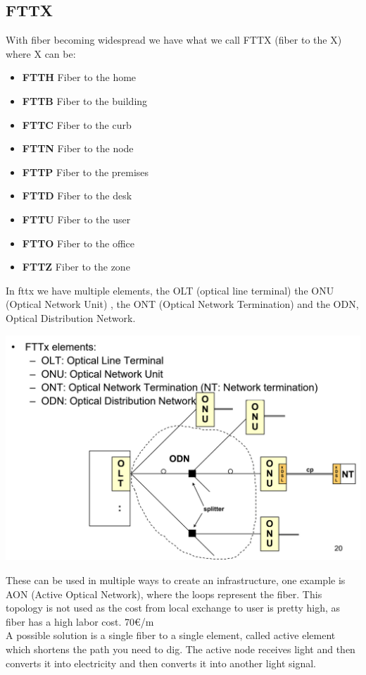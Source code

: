 \documentclass[11pt, a4paper]{article}
\begin{document}
\subsection{FTTX}
With fiber becoming widespread we have what we call FTTX (fiber to the X) where X can be:
\begin{itemize}
    \item \textbf{FTTH} Fiber to the home
    \item \textbf{FTTB} Fiber to the building
    \item \textbf{FTTC} Fiber to the curb
    \item \textbf{FTTN} Fiber to the node
    \item \textbf{FTTP} Fiber to the premises
    \item \textbf{FTTD} Fiber to the desk
    \item \textbf{FTTU} Fiber to the user
    \item \textbf{FTTO} Fiber to the office
    \item \textbf{FTTZ} Fiber to the zone
\end{itemize}
In fttx we have multiple elements, the OLT (optical line terminal) the ONU (Optical Network Unit) , the ONT (Optical Network Termination) and the ODN, Optical Distribution Network.
\begin{center}
    \includegraphics[scale=0.5]{img/AccessNetworks/FTTX/reference.png}
\end{center}
These can be used in multiple ways to create an infrastructure, one example is AON (Active Optical Network), where the loops represent the fiber. This topology is not used as the cost from local exchange to user is pretty high, as fiber has a high labor cost. 70€/m \\
A possible solution is a single fiber to a single element, called active element which shortens the path you need to dig. The active node receives light and then converts it into electricity and then converts it into another light signal.
\end{document}
